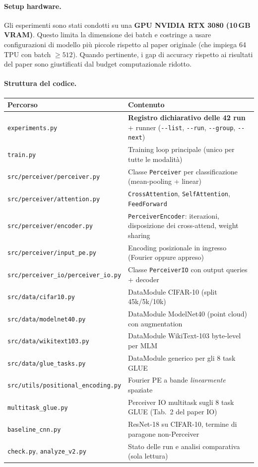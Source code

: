 \documentclass[
  11pt,
]{article}
\begin{document}
\paragraph{Setup hardware.} Gli esperimenti sono stati condotti su una \textbf{GPU NVIDIA RTX 3080 (10\,GB VRAM)}. Questo limita la dimensione dei batch e costringe a usare configurazioni di modello più piccole rispetto al paper originale (che impiega 64 TPU con batch $\geq 512$). Quando pertinente, i gap di accuracy rispetto ai risultati del paper sono giustificati dal budget computazionale ridotto.

\paragraph{Struttura del codice.}

\begin{center}
{\small
\begin{tabular}{@{}p{5cm}p{9cm}@{}}
\toprule
\textbf{Percorso} & \textbf{Contenuto} \\
\midrule
\texttt{experiments.py} & \textbf{Registro dichiarativo delle 42 run} + runner (\texttt{-{}-list}, \texttt{-{}-run}, \texttt{-{}-group}, \texttt{-{}-next}) \\
\texttt{train.py} & Training loop principale (unico per tutte le modalità) \\
\texttt{src/perceiver/perceiver.py} & Classe \texttt{Perceiver} per classificazione (mean-pooling + linear) \\
\texttt{src/perceiver/attention.py} & \texttt{CrossAttention}, \texttt{SelfAttention}, \texttt{FeedForward} \\
\texttt{src/perceiver/encoder.py} & \texttt{PerceiverEncoder}: iterazioni, disposizione dei cross-attend, weight sharing \\
\texttt{src/perceiver/input\_pe.py} & Encoding posizionale in ingresso (Fourier oppure appreso) \\
\texttt{src/perceiver\_io/perceiver\_io.py} & Classe \texttt{PerceiverIO} con output queries + decoder \\
\texttt{src/data/cifar10.py} & DataModule CIFAR-10 (split 45k/5k/10k) \\
\texttt{src/data/modelnet40.py} & DataModule ModelNet40 (point cloud) con augmentation \\
\texttt{src/data/wikitext103.py} & DataModule WikiText-103 byte-level per MLM \\
\texttt{src/data/glue\_tasks.py} & DataModule generico per gli 8 task GLUE \\
\texttt{src/utils/positional\_encoding.py} & Fourier PE a bande \emph{linearmente} spaziate \\
\texttt{multitask\_glue.py} & Perceiver IO multitask sugli 8 task GLUE (Tab.~2 del paper IO) \\
\texttt{baseline\_cnn.py} & ResNet-18 su CIFAR-10, termine di paragone non-Perceiver \\
\texttt{check.py}, \texttt{analyze\_v2.py} & Stato delle run e analisi comparativa (sola lettura) \\
\bottomrule
\end{tabular}
}
\end{center}
\end{document}
